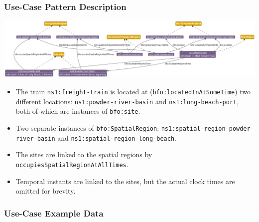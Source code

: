 \subsubsection*{Use-Case Pattern Description}
\includegraphics[scale=0.27]{scenarios/location-change/images/change-of-location-usecase1.png}
\begin{itemize}
    \item The train \texttt{ns1:freight-train} is located at (\texttt{bfo:locatedInAtSomeTime}) two different locations: \texttt{ns1:powder-river-basin} and \texttt{ns1:long-beach-port}, both of which are instances of \texttt{bfo:site}.
    \item Two separate instances of \texttt{bfo:SpatialRegion}: \texttt{ns1:spatial-region-powder-river-basin} and \texttt{ns1:spatial-region-long-beach}.
    \item The sites are linked to the spatial regions by \texttt{occupiesSpatialRegionAtAllTimes}.
    \item Temporal instants are linked to the sites, but the actual clock times are omitted for brevity.
\end{itemize}

\subsubsection*{Use-Case Example Data}

\begin{table}[h]
\label{tab:freight-train-timetable}
\end{table}

